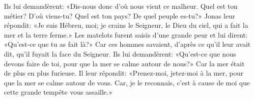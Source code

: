Ils lui demandèrent: «Dis-nous donc d’où nous vient ce malheur.
Quel est ton métier? D’où viens-tu? Quel est ton pays? De quel peuple es-tu?»
Jonas leur répondit: «Je suis Hébreu, moi;
	je crains le Seigneur, le Dieu du ciel, qui a fait la mer et la terre ferme.»
Les matelots furent saisis d’une grande peur et lui dirent:
	«Qu’est-ce que tu as fait là?»
Car ces hommes savaient, d’après ce qu’il leur avait dit,
	qu’il fuyait la face du Seigneur.
Ils lui demandèrent:
	«Qu’est-ce que nous devons faire de toi, pour que la mer se calme autour de nous?»
	Car la mer était de plus en plus furieuse.
Il leur répondit: «Prenez-moi, jetez-moi à la mer,
	pour que la mer se calme autour de vous.
Car, je le reconnais, c’est à cause de moi que cette grande tempête vous assaille.»
